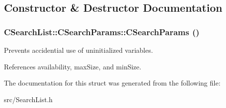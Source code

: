 \subsection{Constructor \& Destructor Documentation}
\subsubsection[{CSearchParams}]{\setlength{\rightskip}{0pt plus 5cm}CSearchList::CSearchParams::CSearchParams ()\hspace{0.3cm}{\ttfamily  [inline]}}\label{structCSearchList_1_1CSearchParams_ab17efd946092dfdb50013ba8191d0b4d}


Prevents accidential use of uninitialized variables. 

References availability, maxSize, and minSize.

The documentation for this struct was generated from the following file:\begin{DoxyCompactItemize}
\item 
src/SearchList.h\end{DoxyCompactItemize}
